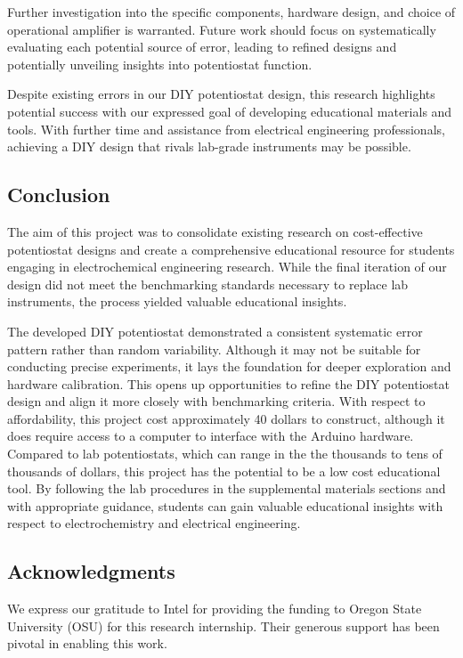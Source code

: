 \documentclass{article}
\begin{document}
Further investigation into the specific components, hardware design, and choice of operational amplifier is warranted. Future work should focus on systematically evaluating each potential source of error, leading to refined designs and potentially unveiling insights into potentiostat function.



Despite existing errors in our DIY potentiostat design, this research highlights potential success with our expressed goal of developing educational materials and tools. With further time and assistance from electrical engineering professionals, achieving a DIY design that rivals lab-grade instruments may be possible.

\subsection*{Conclusion}
The aim of this project was to consolidate existing research on cost-effective potentiostat designs and create a comprehensive educational resource for students engaging in electrochemical engineering research. While the final iteration of our design did not meet the benchmarking standards necessary to replace lab instruments, the process yielded valuable educational insights.

The developed DIY potentiostat demonstrated a consistent systematic error pattern rather than random variability. Although it may not be suitable for conducting precise experiments, it lays the foundation for deeper exploration and hardware calibration. This opens up opportunities to refine the DIY potentiostat design and align it more closely with benchmarking criteria. With respect to affordability, this project cost approximately 40 dollars to construct, although it does require access to a computer to interface with the Arduino hardware. Compared to lab potentiostats, which can range in the the thousands to tens of thousands of dollars, this project has the potential to be a low cost educational tool. By following the lab procedures in the supplemental materials sections and with appropriate guidance, students can gain valuable educational insights with respect to electrochemistry and electrical engineering.

\newpage
\subsection*{Acknowledgments}

We express our gratitude to Intel for providing the funding to Oregon State University (OSU) for this research internship. Their generous support has been pivotal in enabling this work.
\end{document}
